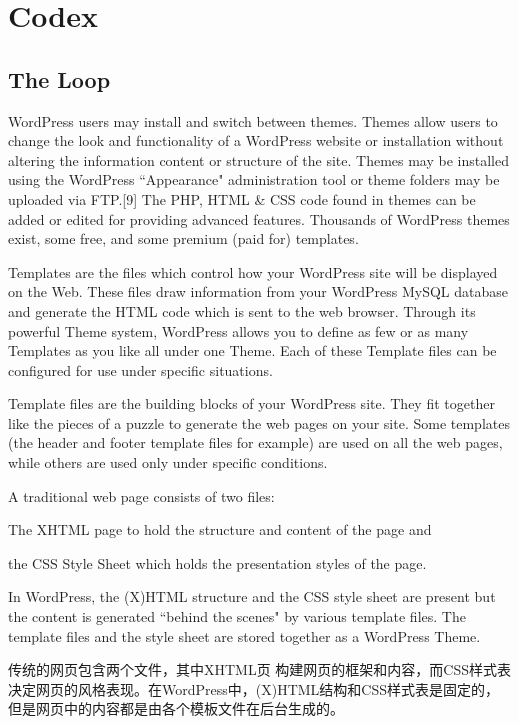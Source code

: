 \part{Codex}



\chapter{The Loop}

WordPress users may install and switch between themes. Themes allow users to change the look and functionality of a WordPress website or installation without altering the information content or structure of the site. Themes may be installed using the WordPress ``Appearance" administration tool or theme folders may be uploaded via FTP.[9] The PHP, HTML \& CSS code found in themes can be added or edited for providing advanced features. Thousands of WordPress themes exist, some free, and some premium (paid for) templates.


Templates are the files which control how your WordPress site will be displayed on the Web. These files draw information from your WordPress MySQL database and generate the HTML code which is sent to the web browser. Through its powerful Theme system, WordPress allows you to define as few or as many Templates as you like all under one Theme. Each of these Template files can be configured for use under specific situations.

Template files are the building blocks of your WordPress site. They fit together like the pieces of a puzzle to generate the web pages on your site. Some templates (the header and footer template files for example) are used on all the web pages, while others are used only under specific conditions.


A traditional web page consists of two files:

\begin{compactitem}
\item The XHTML page to hold the structure and content of the page and
\item the CSS Style Sheet which holds the presentation styles of the page.
\end{compactitem}

In WordPress, the (X)HTML structure and the CSS style sheet are present but the content is generated ``behind the scenes" by various template files. The template files and the style sheet are stored together as a WordPress Theme. 

传统的网页包含两个文件，其中XHTML页 构建网页的框架和内容，而CSS样式表决定网页的风格表现。在WordPress中，(X)HTML结构和CSS样式表是固定的，但是网页中的内容都是由各个模板文件在后台生成的。




